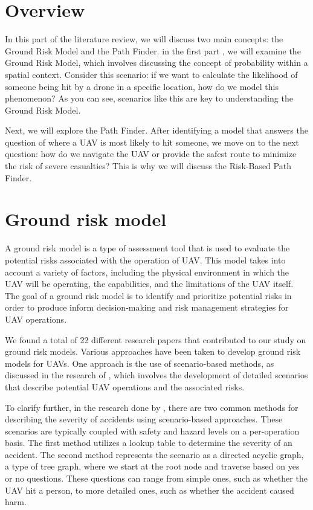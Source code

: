 \documentclass[12pt]{report}
\begin{document}
    \section{Overview}
        In this part of the literature review, we will discuss two main concepts: the Ground Risk Model and the Path
        Finder. in the first part , we will examine the Ground Risk Model, which involves discussing the concept of
        probability within a spatial context. Consider this scenario: if we want to calculate the likelihood of someone
        being hit by a drone in a specific location, how do we model this phenomenon? As you can see, scenarios like
        this are key to understanding the Ground Risk Model.

        Next, we will explore the Path Finder. After identifying a model that answers the question of where a UAV is
        most likely to hit someone, we move on to the next question: how do we navigate the UAV or provide the safest
        route to minimize the risk of severe casualties? This is why we will discuss the Risk-Based Path Finder.
    
    \section{Ground risk model}
        A ground risk model is a type of assessment tool that is used to evaluate the potential risks associated with
        the operation of UAV. This model takes into account a variety of factors, including the physical environment in
        which the UAV will be operating, the capabilities, and the limitations of the UAV itself. The goal of a ground
        risk model is to identify and prioritize potential risks in order to produce inform decision-making and risk
        management strategies for UAV operations.

        We found a total of 22 different research papers that contributed to our study on ground risk models. Various
        approaches have been taken to develop ground risk models for UAVs. One approach is the use of scenario-based
        methods, as discussed in the research of \cite{ancel_real-time_2017}, which involves the development of detailed
        scenarios that describe potential UAV operations and the associated risks.
            
        To clarify further, in the research done by \cite{ancel_real-time_2017}, there are two common methods for
        describing the severity of accidents using scenario-based approaches. These scenarios are typically coupled with
        safety and hazard levels on a per-operation basis. The first method utilizes a lookup table to determine the
        severity of an accident. The second method represents the scenario as a directed acyclic graph, a type of tree
        graph, where we start at the root node and traverse based on yes or no questions. These questions can range from
        simple ones, such as whether the UAV hit a person, to more detailed ones, such as whether the accident caused
        harm.
            
\end{document}
